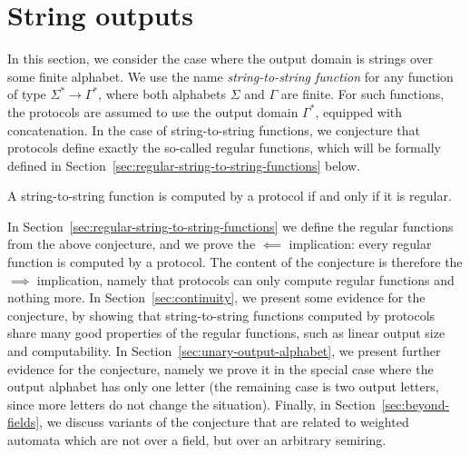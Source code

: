 \section{String outputs}
\label{sec:string-outputs}

In this section, we consider the case where the output domain is strings over some finite alphabet. We use the name \emph{string-to-string function} for any function of type $\Sigma^* \to \Gamma^*$, where both alphabets $\Sigma$ and $\Gamma$ are finite. For such functions, the protocols are assumed to use the output domain $\Gamma^*$, equipped with concatenation. 
 In the case of string-to-string functions, we conjecture that protocols define exactly the so-called regular functions, which will be formally defined in Section~\ref{sec:regular-string-to-string-functions} below.
 


\begin{conjecture}\label{conj:protocol-regular-string-to-string}
    A string-to-string function is computed by a protocol if and only if it is regular. 
\end{conjecture}

In Section~\ref{sec:regular-string-to-string-functions} we  define the regular functions from the above conjecture, and we prove the $\impliedby$ implication: every regular function is computed by a protocol. The content of the conjecture is therefore the $\implies$ implication, namely that protocols can only compute regular functions and nothing more.  In Section~\ref{sec:continuity}, we present some evidence for the conjecture, by showing that string-to-string functions computed by protocols share many good properties of the regular functions, such as linear output size and computability. In Section~\ref{sec:unary-output-alphabet}, we present further evidence for the conjecture, namely we  prove it in the special case where the output alphabet has only one letter (the remaining case is two output letters, since more letters do not change the situation). Finally, in Section~\ref{sec:beyond-fields}, we discuss variants of the conjecture that are related to weighted automata which are not over a field, but over an arbitrary semiring. 




